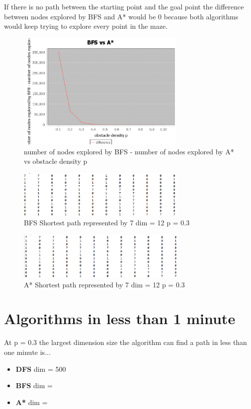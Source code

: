 \documentclass{article}
\begin{document}
   If there is no path between the starting point and the goal point the difference between nodes explored by BFS and A* would be 0 because both algorithms would keep trying to explore every point in the maze.                                                     
   
   \begin{figure}[hpt]
   \centering
\includegraphics[width=3.2in]{BFSvA}

\caption{number of nodes explored by BFS - number of nodes explored by A* vs obstacle density p}
\label{fig:figure3}

\end{figure}
   
   \begin{figure}[hpt]
   \centering
\includegraphics[width=3.2in]{BFS}

\caption{BFS Shortest path represented by 7 dim = 12 p = 0.3}
\label{fig:figure4}

\end{figure}

 \begin{figure}[hpt]
   \centering
\includegraphics[width=3.2in]{astar}

\caption{A* Shortest path represented by 7 dim = 12 p = 0.3}
\label{fig:figure5}

\end{figure}
\bigskip
\bigskip


\section{Algorithms in less than 1 minute}	
At p = 0.3 the largest dimension size the algorithm can find a path in less than one minute is...
\begin{itemize}
\item \textbf{DFS} dim = 500
\item \textbf{BFS} dim =
\item \textbf{A*}  dim =
\end{itemize}
\end{document}
